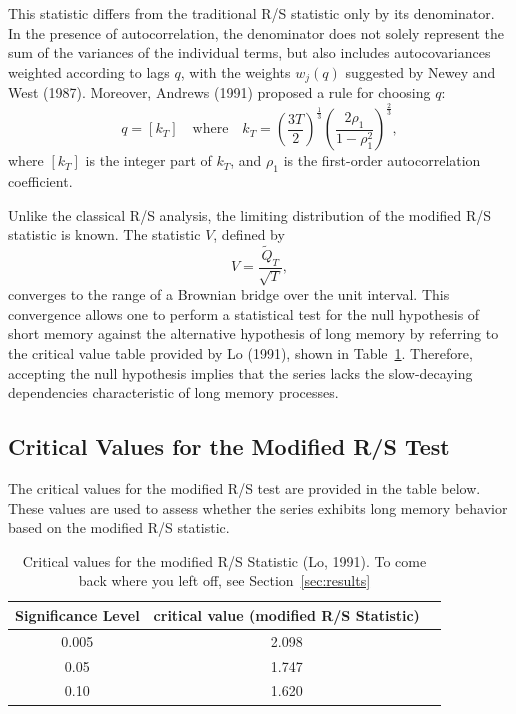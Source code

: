 \documentclass[11pt]{extarticle}
\begin{document}
This statistic differs from the traditional R/S statistic only by its denominator. In the presence of autocorrelation,
the denominator does not solely represent the sum of the variances of the individual terms, but also includes
autocovariances weighted according to lags \(q\), with the weights \(w_j(q)\) suggested by Newey and West (1987).
Moreover, Andrews (1991) proposed a rule for choosing \(q\):
\begin{equation}
    q = \left[ k_T \right] \quad \text{where} \quad k_T = \left( \frac{3T}{2} \right)^{\frac{1}{3}} \left( \frac{2 \rho_1}{1 - \rho_1^2} \right)^{\frac{2}{3}},
\end{equation}
where \([k_T]\) is the integer part of \(k_T\), and \(\rho_1\) is the first-order autocorrelation coefficient.

Unlike the classical R/S analysis, the limiting distribution of the modified R/S statistic is known. The statistic \(V\), defined by
\begin{equation}
    V = \frac{\tilde{Q}_T}{\sqrt{T}},
\end{equation}
converges to the range of a Brownian bridge over the unit interval.
This convergence allows one to perform a statistical test for the null hypothesis of short memory against the
alternative hypothesis of long memory by referring to the critical value table provided by Lo (1991), shown in Table~\ref{table:critical_values}.
Therefore, accepting the null hypothesis implies that the series lacks the slow-decaying dependencies characteristic of long memory processes.


\subsection{Critical Values for the Modified R/S Test}

The critical values for the modified R/S test are provided in the table below. These values are used to assess whether the series exhibits long memory behavior based on the modified R/S statistic.

\begin{table}[ht!]
\centering
\begin{tabular}{|c|c|c|}
\hline
\textbf{Significance Level} & \textbf{critical value (modified R/S Statistic)} \\
\hline
0.005 & 2.098\\
0.05 & 1.747\\
0.10 & 1.620\\

\hline
\end{tabular}
\caption{Critical values for the modified R/S Statistic (Lo, 1991). To come back where you left off, see Section~\ref{sec:results}}
    \label{table:critical_values}
\end{table}
\end{document}
